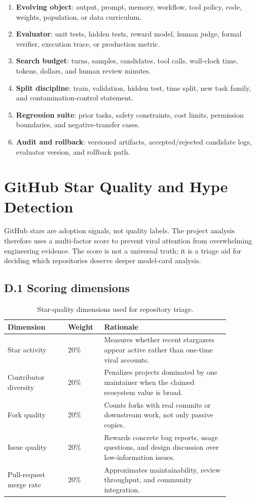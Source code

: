 \begin{enumerate}
\item \textbf{Evolving object}: output, prompt, memory, workflow, tool policy, code, weights, population, or data curriculum.
\item \textbf{Evaluator}: unit tests, hidden tests, reward model, human judge, formal verifier, execution trace, or production metric.
\item \textbf{Search budget}: turns, samples, candidates, tool calls, wall-clock time, tokens, dollars, and human review minutes.
\item \textbf{Split discipline}: train, validation, hidden test, time split, new task family, and contamination-control statement.
\item \textbf{Regression suite}: prior tasks, safety constraints, cost limits, permission boundaries, and negative-transfer cases.
\item \textbf{Audit and rollback}: versioned artifacts, accepted/rejected candidate logs, evaluator version, and rollback path.
\end{enumerate}

\section{GitHub Star Quality and Hype Detection}
\label{app:star-quality}

GitHub stars are adoption signals, not quality labels. The project analysis therefore uses a multi-factor score to prevent viral attention from overwhelming engineering evidence. The score is not a universal truth; it is a triage aid for deciding which repositories deserve deeper model-card analysis.

\subsection*{D.1 Scoring dimensions}

\begin{table}[t]
\centering
\TableTight
\caption{Star-quality dimensions used for repository triage.}
\label{tab:star-quality-dimensions}
\begin{tabular}{@{}L{0.24\linewidth}L{0.13\linewidth}L{0.50\linewidth}@{}}
\toprule
\textbf{Dimension} & \textbf{Weight} & \textbf{Rationale} \\
\midrule
Star activity & 20\% & Measures whether recent stargazers appear active rather than one-time viral accounts. \\
Contributor diversity & 20\% & Penalizes projects dominated by one maintainer when the claimed ecosystem value is broad. \\
Fork quality & 20\% & Counts forks with real commits or downstream work, not only passive copies. \\
Issue quality & 20\% & Rewards concrete bug reports, usage questions, and design discussion over low-information issues. \\
Pull-request merge rate & 20\% & Approximates maintainability, review throughput, and community integration. \\
\bottomrule
\end{tabular}
\end{table}

